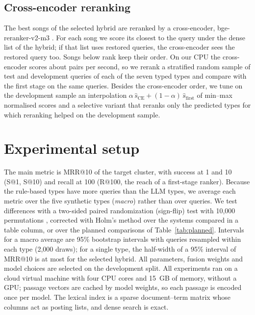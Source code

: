 \documentclass[11pt]{article}
\makeatletter
\newcommand{\mrr}{MRR@10\xspace}
\makeatother
\begin{document}
\subsection{Cross-encoder reranking}\label{sec:rerank}
The \RerankDepth{} best songs of the selected hybrid are reranked by a cross-encoder, bge-reranker-v2-m3
\citep{chen2024bgem3}. For each song we score its \RerankPassagesWord{} closest to the query under the dense
list of the hybrid; if that list uses restored queries, the cross-encoder sees the restored query too. Songs
below rank \RerankDepth{} keep their order. On our CPU the cross-encoder scores about \RerankPairsPerSec{} pairs
per second, so we rerank a stratified random sample of \RerankSampleTest{} test and \RerankSampleDev{}
development queries of each of the seven typed types and compare with the first stage on the same queries.
Besides the cross-encoder order, we tune on the development sample an interpolation
$\alpha\,\hat s_{\mathrm{CE}} + (1-\alpha)\,\hat s_{\mathrm{first}}$ of min--max normalised scores and a
selective variant that reranks only the predicted types for which reranking helped on the development
sample.

\section{Experimental setup}\label{sec:setup}

The main metric is \mrr{} of the target cluster, with success at 1 and 10 (S@1, S@10) and recall at 100
(R@100, the reach of a first-stage ranker). Because the rule-based types have more queries than the LLM
types, we average each metric over the five synthetic types (\emph{macro}) rather than over queries. We test
differences with a two-sided paired randomization (sign-flip) test with 10,000 permutations
\citep{smucker2007significance}, corrected with Holm's method \citep{holm1979} over the systems compared in a
table column, or over the planned comparisons of Table~\ref{tab:planned}. Intervals for a macro average are 95\%
bootstrap intervals with queries resampled within each type (2{,}000 draws); for a single type, the half-width
of a 95\% interval of \mrr{} is at most \CIHalfSelMax{} for the selected hybrid. All parameters, fusion
weights and model choices are selected on the development split.
All experiments ran on a cloud virtual machine with four CPU cores and 15~GB of memory, without a GPU;
passage vectors are cached by model weights, so each passage is encoded once per model. The lexical index
is a sparse document--term matrix whose columns act as posting lists, and dense search is exact.
\end{document}
